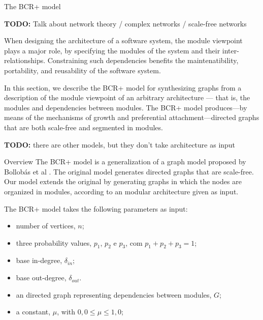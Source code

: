 \documentclass[11pt,twocolumn,a4paper,english]{article}
\newcommand{\TODO}{\textbf{TODO:} }
\begin{document}

\begin{section}{The BCR+ model}	
	\newcommand{\din}[0]{\ensuremath{\delta_{in}}}
	\newcommand{\dout}[0]{\ensuremath{\delta_{out}}}
	\newcommand{\gin}[0]{\ensuremath{\mathrm{g}_{in}}}
	\newcommand{\gout}[0]{\ensuremath{\mathrm{g}_{out}}}
	
	\TODO Talk about network theory / complex networks / scale-free networks	

	When designing the architecture of a software system, the module viewpoint plays a major role, by specifying the modules of the system and their inter-relationships. Constraining such dependencies benefits the maintenatibility, portability, and reusability of the software system.
	
	In this section, we describe the BCR+ model for synthesizing graphs from a description of the module viewpoint of an arbitrary architecture --- that is, the modules and dependencies between modules. The BCR+ model produces---by means of the mechanisms of growth and preferential attachment---directed graphs that are both scale-free and segmented in modules.
	
	\TODO there are other models, but they don't take architecture as input	
	
\begin{subsection}{Overview}
	The BCR+ model is a generalization of a graph model proposed by Bollobás et al \cite{Bollobas2003}. The original model generates directed graphs that are scale-free. Our model extends the original by generating graphs in which the nodes are organized in modules, according to an modular architecture given as input.
	
	The BCR+ model takes the following parameters as input:
	
	\begin{itemize}
  \item number of vertices, $n$;
  \item three probability values, $p_1$, $p_2$ e $p_3$, com $p_1 + p_2 + p_3 = 1$;
  \item base in-degree, $\din$;
  \item base out-degree, $\dout$.
  \item an directed graph representing dependencies between modules, $G$;
  \item a constant, $\mu$, with $0,0 \le \mu \le 1,0$;
  \end{itemize}
  

\end{subsection}
\end{section}
\end{document}
